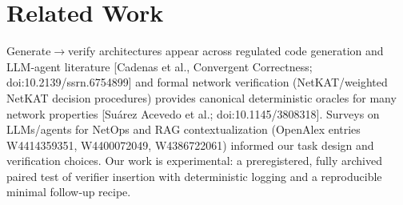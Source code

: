 \documentclass[conference]{IEEEtran}
\begin{document}
\section{Related Work}
Generate\ensuremath{\rightarrow}verify architectures appear across regulated code generation and LLM‑agent literature [Cadenas et al., Convergent Correctness; doi:10.2139/ssrn.6754899] and formal network verification (NetKAT/weighted NetKAT decision procedures) provides canonical deterministic oracles for many network properties [Suárez Acevedo et al.; doi:10.1145/3808318]. Surveys on LLMs/agents for NetOps and RAG contextualization (OpenAlex entries W4414359351, W4400072049, W4386722061) informed our task design and verification choices. Our work is experimental: a preregistered, fully archived paired test of verifier insertion with deterministic logging and a reproducible minimal follow‑up recipe.
\end{document}
